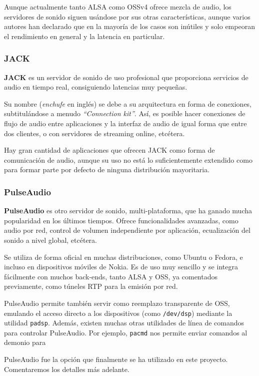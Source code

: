 Aunque actualmente tanto ALSA como OSSv4 ofrece mezcla de audio, los servidores
de sonido siguen usándose por sus otras características, aunque varios autores
han declarado que en la mayoría de los casos son inútiles y solo empeoran el
rendimiento en general y la latencia en particular.

\subsubsection{JACK}

\textbf{JACK} es un servidor de sonido de uso profesional que proporciona
servicios de audio en tiempo real, consiguiendo latencias muy pequeñas. 

Su nombre (\textit{enchufe} en inglés) se debe a su arquitectura en forma de
conexiones, subtitulándose a menudo \textit{``Connection kit''}. Así, es posible
hacer conexiones de flujo de audio entre aplicaciones y la interfaz de audio de
igual forma que entre dos clientes, o con servidores de streaming online,
etcétera.

Hay gran cantidad de aplicaciones que ofrecen JACK como forma de comunicación de
audio, aunque su uso no está lo suficientemente extendido como para formar parte
por defecto de ninguna distribución mayoritaria.

\subsubsection{PulseAudio}
\label{sec:pulseaudio1}
\textbf{PulseAudio} es otro servidor de sonido, multi-plataforma, que ha ganado
mucha popularidad en los últimos tiempos. Ofrece funcionalidades avanzadas, como
audio por red, control de volumen independiente por aplicación, ecualización del
sonido a nivel global, etcétera.

Se utiliza de forma oficial en muchas distribuciones, como Ubuntu o Fedora, e
incluso en dispositivos móviles de Nokia. Es de uso muy sencillo y se integra
fácilmente con muchos back-ends, tanto ALSA y OSS, ya comentados previamente,
como túneles RTP para la emisión por red.

PulseAudio permite también servir como reemplazo transparente de OSS, emulando
el acceso directo a los dispositivos (como \texttt{/dev/dsp}) mediante la
utilidad \texttt{padsp}. Además, existen muchas otras utilidades de línea de
comandos para controlar PulseAudio. Por ejemplo, \texttt{pacmd} nos permite
enviar comandos al demonio para 

PulseAudio fue la opción que finalmente se ha utilizado en este proyecto.
Comentaremos los detalles más adelante.

